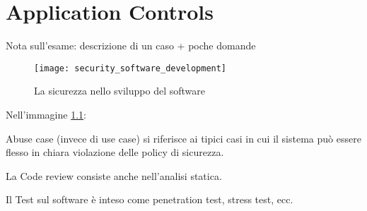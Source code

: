 \chapter{Application Controls}
\label{cs:ac}

Nota sull'esame: descrizione di un caso + poche domande

\begin{figure}[h!]
        \begin{center}
                \texttt{[image: security\_software\_development]}
        \end{center}
        \caption{La sicurezza nello sviluppo del software}
        \label{fig:security:software:development}
\end{figure}

Nell'immagine \ref{fig:security:software:development}:

\begin{enumerate*}[label=\alph*)]
	\item Abuse case (invece di use case) si riferisce ai  tipici casi in cui il 
	sistema può essere flesso in chiara violazione delle policy di 
	sicurezza. 
	\item La Code review consiste anche nell'analisi statica.
	\item Il Test sul software è inteso come penetration test, stress test, ecc.
\end{enumerate*}

